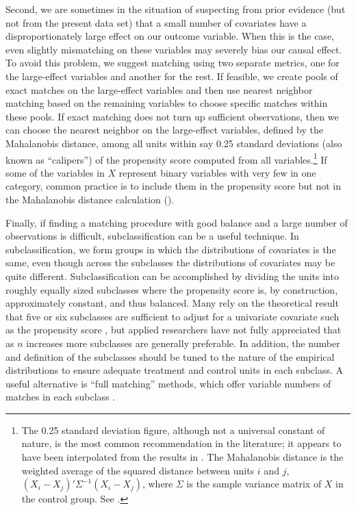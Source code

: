 \documentclass[11pt,titlepage]{article}
\begin{document}
Second, we are sometimes in the situation of suspecting from prior
evidence (but not from the present data set) that a small number of
covariates have a disproportionately large effect on our outcome
variable.  When this is the case, even slightly mismatching on these
variables may severely bias our causal effect.  To avoid this problem,
we suggest matching using two separate metrics, one for the
large-effect variables and another for the rest.  If feasible, we
create pools of exact matches on the large-effect variables and then
use nearest neighbor matching based on the remaining variables to
choose specific matches within these pools.  If exact matching does
not turn up sufficient observations, then we can choose the nearest
neighbor on the large-effect variables, defined by the Mahalanobis
distance, among all units within say 0.25 standard deviations (also
known as ``calipers'') of the propensity score computed from all
variables.\footnote{The 0.25 standard deviation figure, although not a
  universal constant of nature, is the most common recommendation in
  the literature; it appears to have been interpolated from the
  results in \citet{CocRub73}.  The Mahalanobis distance is the
  weighted average of the squared distance between units $i$ and $j$,
  $(X_i-X_j)'\Sigma^{-1}(X_i-X_j)$, where $\Sigma$ is the sample
  variance matrix of $X$ in the control group.  See \cite{RubTho00}.}
If some of the variables in $X$ represent binary variables with very
few in one category, common practice is to include them in the
propensity score but not in the Mahalanobis distance calculation
(\citealp{GuRos93, RubTho00}).

Finally, if finding a matching procedure with good balance and a large
number of observations is difficult, subclassification can be a useful
technique.  In subclassification, we form groups in which the
distributions of covariates is the same, even though across the
subclasses the distributions of covariates may be quite different.
Subclassification can be accomplished by dividing the units into
roughly equally sized subclasses where the propensity score is, by
construction, approximately constant, and thus balanced.  Many rely on
the theoretical result that five or six subclasses are sufficient to
adjust for a univariate covariate such as the propensity score
\citep{Cochran68,RosRub84}, but applied researchers have not fully
appreciated that as $n$ increases more subclasses are generally
preferable.  In addition, the number and definition of the subclasses
should be tuned to the nature of the empirical distributions to ensure
adequate treatment and control units in each subclass.  A useful
alternative is ``full matching'' methods, which offer variable numbers
of matches in each subclass \citep{Hansen04}.
\end{document}
